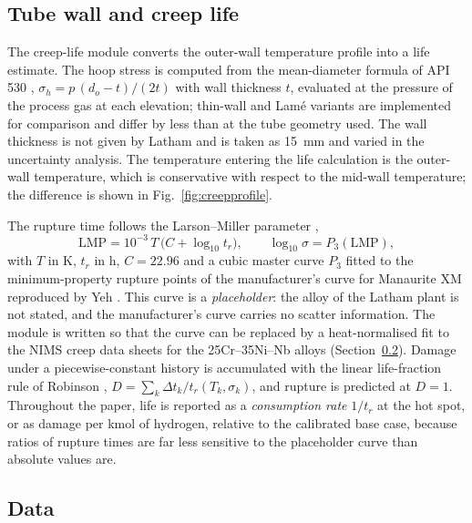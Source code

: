 \subsection{Tube wall and creep life}
\label{sec:creep}

The creep-life module converts the outer-wall temperature profile into a life estimate. The hoop stress is computed from the
mean-diameter formula of API 530 \cite{api530}, $\sigma_h = p\,(d_o - t)/(2t)$ with wall thickness $t$, evaluated at the pressure of
the process gas at each elevation; thin-wall and Lam\'e variants are implemented for comparison and differ by less than
 at the tube geometry used. The wall thickness is not given by Latham and is taken as \SI{15}{mm}
 and varied in the uncertainty analysis. The
temperature entering the life calculation is the outer-wall temperature, which is conservative with respect to the mid-wall
temperature; the difference is shown in Fig.~\ref{fig:creepprofile}.

The rupture time follows the Larson--Miller parameter \cite{larson1952},
\begin{equation}
\mathrm{LMP} = 10^{-3}\,T\,\bigl(C + \log_{10} t_r\bigr), \qquad \log_{10}\sigma = P_3(\mathrm{LMP}),
\label{eq:lmp}
\end{equation}
with $T$ in K, $t_r$ in h, $C = 22.96$ and a cubic master curve $P_3$ fitted to the minimum-property rupture points of the
manufacturer's curve for Manaurite XM reproduced by Yeh \cite{yeh2021}. This curve is a \emph{placeholder}: the alloy of the
Latham plant is not stated, and the manufacturer's curve carries no scatter information. The module is written so that the curve
can be replaced by a heat-normalised fit to the NIMS creep data sheets for the 25Cr--35Ni--Nb alloys \cite{nims1990,nims1991}
(Section~\ref{sec:data}). Damage under a piecewise-constant history is accumulated with the linear life-fraction rule of Robinson
\cite{robinson1952}, $D = \sum_k \Delta t_k / t_r(T_k, \sigma_k)$, and rupture is predicted at $D = 1$. Throughout the paper, life is
reported as a \emph{consumption rate} $1/t_r$ at the hot spot, or as damage per kmol of hydrogen, relative to the calibrated base
case, because ratios of rupture times are far less sensitive to the placeholder curve than absolute values are.

\subsection{Data}
\label{sec:data}

